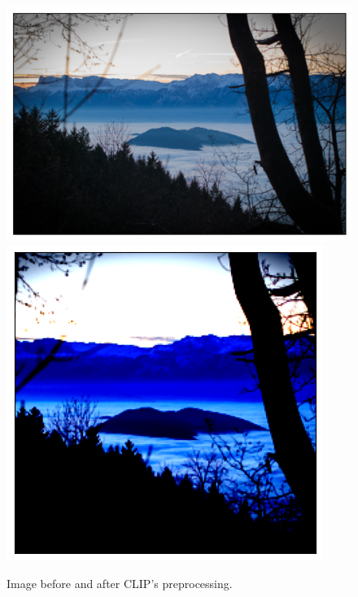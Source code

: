 \documentclass[12pt,a4paper]{article}
\begin{document}
\begin{figure}[H]
    \centering
    \includegraphics[height=.3\textwidth]{img/img.png}
    \includegraphics[height=.3\textwidth]{img/img_preprocess.png}
    \caption{Image before and after CLIP's preprocessing.}
    \label{fig:preprocessing}
\end{figure}
\end{document}
